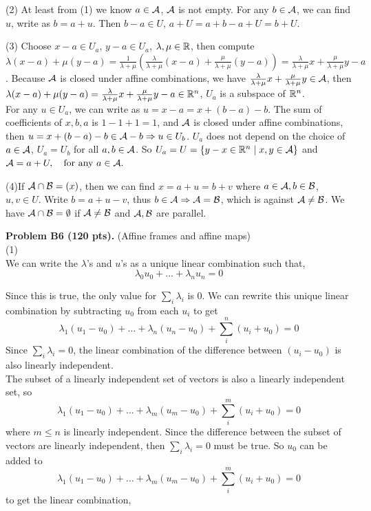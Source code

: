 \documentclass[12pt]{article}
\begin{document}
\medskip
(2) At least from (1) we know $a \in {\cal A}$, ${\cal A}$ is not empty.
For any $b \in {\cal A}$, we can find $u$, write as $b = a + u$. Then   $b - a \in U$, $a + U = a + b - a + U = b + U$.

\medskip
(3)
Choose $x - a \in U_a$, $y - a \in U_a$, $\lambda, \mu \in \mathbb{R}$, then compute $\lambda (x - a) + \mu (y - a) = \frac{1}{\lambda + \mu}(\frac{\lambda}{\lambda + \mu}(x - a) + \frac{\mu}{\lambda + \mu}(y - a)) = \frac{\lambda}{\lambda + \mu} x + \frac{\mu}{\lambda + \mu} y - a$. Because ${\cal A}$ is closed under affine combinations, we have $\frac{\lambda}{\lambda + \mu} x + \frac{\mu}{\lambda + \mu} y \in {\cal A}$, then $\lambda (x - a) + \mu (y - a) = \frac{\lambda}{\lambda + \mu} x + \frac{\mu}{\lambda + \mu} y - a \in \mathbb{R}^n$, $U_a$ is a subspace of $\mathbb{R}^n$.\\
For any $u \in U_a$, we can write as $u = x - a = x + (b - a) - b$. The sum of coefficients of $x, b, a$ is $1 -1 + 1 = 1$, and ${\cal A}$ is closed under affine combinations, then $u = x + (b -a)-b \in {\cal A} - b \Rightarrow u \in U_b$. $U_a$ does not depend on the choice of $a \in {\cal A}$, $U_a = U_b$ for all $a, b\in {\cal A}$.
So $U_a = U = \{y - x \in \mathbb{R}^n \mid x, y \in {\cal A}\}$ and
$
{\cal A} = a + U, \quad\hbox{for any $a\in {\cal A}$}.
$

\medskip
(4)If ${\cal A}\cap {\cal B} = (x)$, then we can find $x = a + u = b + v$ where $a \in {\cal A}, b \in {\cal B}$, $u, v \in U$. Write $b = a + u - v$, thus $b \in {\cal A} \Rightarrow {\cal A} = {\cal B}$, which is against ${\cal A} \neq {\cal B}$. We have ${\cal A} \cap {\cal B} = \emptyset$ if ${\cal A} \neq {\cal B}$ and ${\cal A}, {\cal B}$ are parallel. 

\vspace {0.25cm}\noindent
{\bf Problem B6 (120 pts).} (Affine frames and affine maps) \\
(1) \\

We can write the $\lambda$'s and $u$'s as a unique linear combination such that, 
$$ \lambda_0 u_0 + \ldots + \lambda_n u_n = 0 $$

Since this is true, the only value for $\sum_{i} \lambda_i$ is 0. We can rewrite this unique linear combination by subtracting $u_0$ from each $u_i$ to get $$\lambda_1 (u_1 - u_0) + \ldots + \lambda_n (u_n - u_0) + \sum_{i}^{n} (u_i + u_0) = 0$$ Since $\sum_{i} \lambda_i = 0$, the linear combination of the difference between $(u_i - u_0)$ is also linearly independent. \\

The subset of a linearly independent set of vectors is also a linearly independent set, so $$\lambda_1 (u_1 - u_0) + \ldots + \lambda_m (u_m - u_0) + \sum_{i}^{m} (u_i + u_0) = 0$$ where $m \leq n$ is linearly independent. Since the difference between the subset of vectors are linearly independent, then $\sum_{i} \lambda_i = 0$ must be true. So $u_0$ can be added to $$\lambda_1 (u_1 - u_0) + \ldots + \lambda_m (u_m - u_0) + \sum_{i}^{m} (u_i + u_0) = 0$$ to get the linear combination, 
\end{document}
